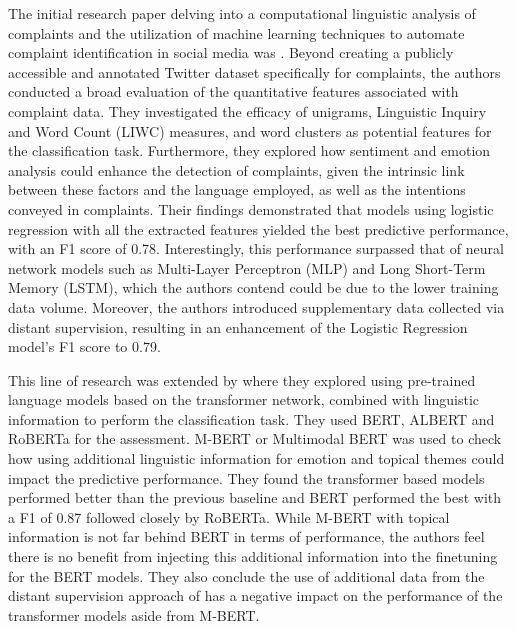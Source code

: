 The initial research paper delving into a computational linguistic analysis of complaints and the utilization of machine learning techniques to automate complaint identification in social media was \cite{preotiuc-pietro_automatically_2019}. Beyond creating a publicly accessible and annotated Twitter dataset specifically for complaints, the authors conducted a broad evaluation of the quantitative features associated with complaint data. They investigated the efficacy of unigrams, Linguistic Inquiry and Word Count (LIWC) measures, and word clusters as potential features for the classification task. Furthermore, they explored how sentiment and emotion analysis could enhance the detection of complaints, given the intrinsic link between these factors and the language employed, as well as the intentions conveyed in complaints. Their findings demonstrated that models using logistic regression with all the extracted features yielded the best predictive performance, with an F1 score of 0.78. Interestingly, this performance surpassed that of neural network models such as Multi-Layer Perceptron (MLP) and Long Short-Term Memory (LSTM), which the authors contend could be due to the lower training data volume. Moreover, the authors introduced supplementary data collected via distant supervision, resulting in an enhancement of the Logistic Regression model's F1 score to 0.79.

This line of research was extended by \cite{jin_complaint_2020} where they explored using pre-trained language models based on the transformer \cite{vaswaniAttentionAllYou2023a} network, combined with linguistic information to perform the classification task. They used BERT, ALBERT and RoBERTa for the assessment. M-BERT or Multimodal BERT was used to check how using additional linguistic information for emotion and topical themes could impact the predictive performance. They found the transformer based models performed better than the previous baseline \cite{preotiuc-pietro_automatically_2019} and BERT performed the best with a F1 of 0.87 followed closely by RoBERTa. While M-BERT with topical information is not far behind BERT in terms of performance, the authors feel there is no benefit from injecting this additional information into the finetuning for the BERT models. They also conclude the use of additional data from the distant supervision approach of \cite{preotiuc-pietro_automatically_2019} has a negative impact on the performance of the transformer models aside from M-BERT. \\


